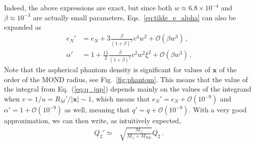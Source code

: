 \documentclass[reprint,nofootinbib,prd,aps]{revtex4-2}
\begin{document}
Indeed, the above expressions are exact, but since both $w\approx 6.8\times 10^{-4}$ and $\beta \approx 10^{-3}$ are actually small parameters, Eqs.~\eqref{eq:tilde_e_alpha} can also be expanded as
\begin{subequations}
\begin{align}
     e_N'&= e_N +  3 \frac{\beta}{(1+\beta)^2} v^4w^2+\mathcal O(\beta w^3)\, , \\
     \alpha' & = 1 + \frac{15}{2} \frac{\beta}{(1+\beta)^2}v^2w^2\xi^2 + \mathcal O(\beta w^3) \, . 
\end{align}
\end{subequations}
Note that the aspherical phantom density is significant for values of $\bm x$ of the order of the MOND radius, see Fig.~\ref{fig:phantom}. This means that the value of the integral from Eq.~(\ref{eq:q_jup}) depends mainly on the values of the integrand when $v=1/u=R_M'/\left|\bm x\right|\sim 1$, which means that $ e_N'=e_N+\mathcal O\left(10^{-9}\right)$ and $ \alpha' =1+\mathcal O\left(10^{-9}\right)$ as well, meaning that $q'=q +  \mathcal O \left(10^{-9}\right)$. With a very good approximation, we can then write, as intuitively expected,
\begin{align}
Q_2' \simeq
&\sqrt{\frac{M_\odot}{M_\odot+M_\mathrm{Jup}}} Q_2 \, .
\end{align}
\end{document}
